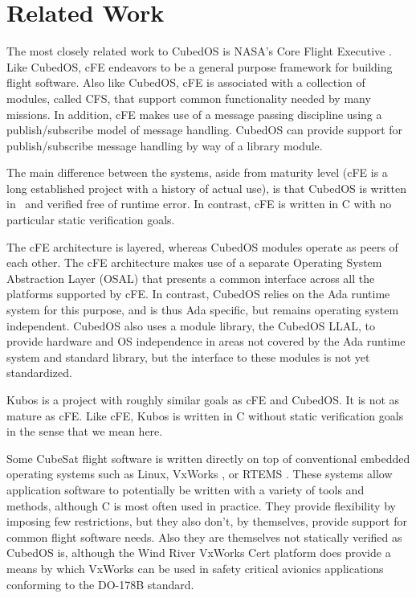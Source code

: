 
\chapter{Related Work}
\label{chapt:related-work}

The most closely related work to CubedOS is NASA's Core Flight Executive \cite{cFE}. Like
CubedOS, cFE endeavors to be a general purpose framework for building flight software. Also like
CubedOS, cFE is associated with a collection of modules, called CFS, that support common
functionality needed by many missions. In addition, cFE makes use of a message passing
discipline using a publish/subscribe model of message handling. CubedOS can provide support for
publish/subscribe message handling by way of a library module.

The main difference between the systems, aside from maturity level (cFE is a long established
project with a history of actual use), is that CubedOS is written in \SPARK\ and verified free
of runtime error. In contrast, cFE is written in C with no particular static verification goals.

The cFE architecture is layered, whereas CubedOS modules operate as peers of each other. The cFE
architecture makes use of a separate Operating System Abstraction Layer (OSAL) that presents a
common interface across all the platforms supported by cFE. In contrast, CubedOS relies on the
Ada runtime system for this purpose, and is thus Ada specific, but remains operating system
independent. CubedOS also uses a module library, the CubedOS LLAL, to provide hardware and OS
independence in areas not covered by the Ada runtime system and standard library, but the
interface to these modules is not yet standardized.

Kubos \cite{kubos} is a project with roughly similar goals as cFE and CubedOS. It is not as
mature as cFE. Like cFE, Kubos is written in C without static verification goals in the sense
that we mean here.

Some CubeSat flight software is written directly on top of conventional embedded operating
systems such as Linux, VxWorks \cite{vxworks}, or RTEMS \cite{rtems}. These systems allow
application software to potentially be written with a variety of tools and methods, although C
is most often used in practice. They provide flexibility by imposing few restrictions, but they
also don't, by themselves, provide support for common flight software needs. Also they are
themselves not statically verified as CubedOS is, although the Wind River VxWorks Cert platform
\cite{vxworks-cert} does provide a means by which VxWorks can be used in safety critical
avionics applications conforming to the DO-178B standard.
